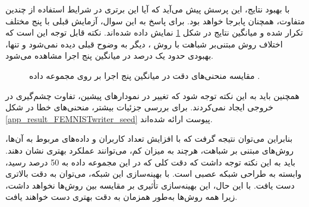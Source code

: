 با بهبود نتایج، این پرسش پیش می‌آید که آیا این برتری در شرایط استفاده از چندین
متفاوت، همچنان پابرجا خواهد بود. برای پاسخ به این سوال، آزمایش قبلی با پنج
مختلف تکرار شده و میانگین نتایج در شکل
\ref{result_FEMNISTwriter_seed}
نمایش داده شده‌اند. نکته قابل توجه این است که اختلاف روش مبتنی‌بر شباهت با روش
%
، دیگر به وضوح قبلی دیده نمی‌شود و تنها، بهبودی حدود یک درصد در میانگین پنج اجرا مشاهده می‌شود.
\begin{figure}[t]
	\centering
	\hspace{0.8mm}
	\caption{
		مقایسه منحنی‌های دقت در میانگین پنج اجرا بر روی مجموعه داده
		.
	}
	\label{result_FEMNISTwriter_seed}
\end{figure}
همچنین باید به این نکته توجه شود که تغییر
در نمودارهای پیشین، تفاوت چشم‌گیری در خروجی ایجاد نمی‌کردند.
برای بررسی جزئیات بیشتر، منحنی‌های خطا در شکل
\ref{app_result_FEMNISTwriter_seed}
پیوست ارائه شده‌اند.


بنابراین می‌توان نتیجه گرفت که با افزایش تعداد کاربران و داده‌های مربوط به آن‌ها، روش‌های مبتنی بر شباهت، هرچند به میزان کم، می‌توانند عملکرد بهتری نشان دهند.
باید به این نکته توجه داشت که دقت کلی که در این مجموعه داده به 50 درصد رسید، وابسته به طراحی شبکه عصبی است. با بهینه‌سازی این شبکه، می‌توان به دقت بالاتری دست یافت. با این حال، این بهینه‌سازی تأثیری بر مقایسه بین روش‌ها نخواهد داشت، زیرا همه روش‌ها به‌طور همزمان به دقت بهتری دست خواهند یافت.



